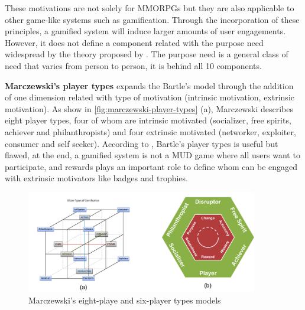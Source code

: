 These motivations are not solely for MMORPGs but they are also applicable to other game-like systems such as gamification. Through the incorporation of these principles, a gamified system will induce larger amounts of user engagements. However, it does not define a component related with the purpose need widespread by the theory proposed by . The purpose need is a general class of need that varies from person to person, it is behind all 10 components.

\textbf{Marczewski's player types} \cite{Marczewski2015a, Marczewski2015d} expands the Bartle's model through the addition of one dimension related with type of motivation (intrinsic motivation, extrinsic motivation). As show in \autoref{fig:marczewski-player-types} (a), Marczewski describes eight player types, four of whom are intrinsic motivated (socializer, free spirits, achiever and philanthropists) and four extrinsic motivated (networker, exploiter, consumer and self seeker). According to , Bartle's player types is useful but flawed, at the end, a gamified system is not a MUD game where all users want to participate, and rewards plays an important role to define whom can be engaged with extrinsic motivators like badges and trophies.

\begin{figure}[htb]
 \caption{Marczewski's eight-playe and six-player types models}
 \label{fig:marczewski-player-types}
 \centering
 \includegraphics[width=0.9\textwidth]{images/chap-general-background/marczewski-player-types.png}
\end{figure}

